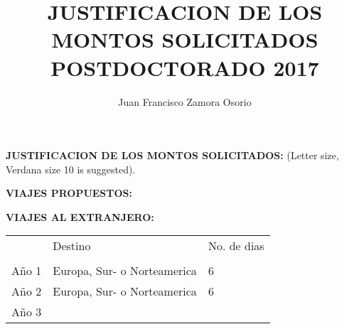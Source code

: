 \documentclass[10pt]{article}
\author{Juan Francisco Zamora Osorio}
\title{JUSTIFICACION DE LOS MONTOS SOLICITADOS POSTDOCTORADO 2017}
\begin{document}
\noindent \textbf{JUSTIFICACION DE LOS MONTOS SOLICITADOS:}
\vspace{5pt}
\vspace{5pt}
\noindent(Letter size, Verdana size 10 is suggested).



\noindent \textbf{VIAJES PROPUESTOS:  }


\vspace{15pt}
\noindent\textbf{VIAJES AL EXTRANJERO:}
\vspace{15pt}
\begin{comment}
\begin{tabular}{l|l|l|}
\cline{2-3}
                             & Destination & No. of Days \\ \cline{2-3} 
                             &             &             \\ \hline
\multicolumn{1}{|l|}{Year 1} &      Europe, South or North America       &     6        \\ \hline
\multicolumn{1}{|l|}{Year 2} &       Europe, South or North America      &      6       \\ \hline
\multicolumn{1}{|l|}{Year 3} &            &           \\ \hline
\end{tabular}
\vspace{15pt}
\end{comment}
\vspace{15pt}

\begin{tabular}{l|l|l|}
\cline{2-3}
                             & Destino & No. de dias \\ \cline{2-3} 
                             &             &             \\ \hline
\multicolumn{1}{|l|}{Año 1} &      Europa, Sur- o Norteamerica       &     6        \\ \hline
\multicolumn{1}{|l|}{Año 2} &       Europa, Sur- o Norteamerica       &      6       \\ \hline
\multicolumn{1}{|l|}{Año 3} &            &           \\ \hline
\end{tabular}
\vspace{15pt}
\end{document}
